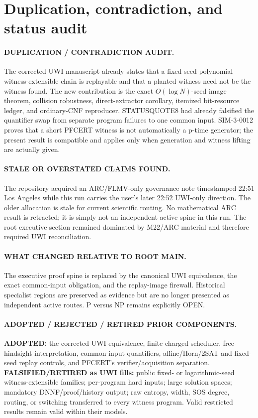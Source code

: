 \documentclass[11pt]{article}
\begin{document}
\section{Duplication, contradiction, and status audit}
\paragraph{DUPLICATION / CONTRADICTION AUDIT.}
The corrected UWI manuscript already states that a fixed-seed polynomial
witness-extensible chain is replayable and that a planted witness need not be the
witness found.  The new contribution is the exact $O(\log N)$-seed image theorem,
collision robustness, direct-extractor corollary, itemized bit-resource ledger, and
ordinary-CNF reproducer.  STATUSQUOTE8 had already falsified the quantifier swap
from separate program failures to one common input.  SIM-3-0012 proves that a short
PFCERT witness is not automatically a p-time generator; the present result is
compatible and applies only when generation and witness lifting are actually given.

\paragraph{STALE OR OVERSTATED CLAIMS FOUND.}
The repository acquired an ARC/FLMV-only governance note timestamped 22:51 Los
Angeles while this run carries the user's later 22:52 UWI-only direction.  The
older allocation is stale for current scientific routing.  No mathematical ARC
result is retracted; it is simply not an independent active spine in this run.
The root executive section remained dominated by M22/ARC material and therefore
required UWI reconciliation.

\paragraph{WHAT CHANGED RELATIVE TO ROOT MAIN.}
The executive proof spine is replaced by the canonical UWI equivalence, the exact
common-input obligation, and the replay-image firewall.  Historical specialist
regions are preserved as evidence but are no longer presented as independent active
routes.  P versus NP remains explicitly OPEN.

\paragraph{ADOPTED / REJECTED / RETIRED PRIOR COMPONENTS.}
\textbf{ADOPTED:} the corrected UWI equivalence, finite charged scheduler,
free-hindsight interpretation, common-input quantifiers, affine/Horn/2SAT and
fixed-seed replay controls, and PFCERT's verifier/acquisition separation.
\textbf{FALSIFIED/RETIRED as UWI fills:} public fixed- or logarithmic-seed
witness-extensible families; per-program hard inputs; large solution spaces;
mandatory DNNF/proof/history output; raw entropy, width, SOS degree, routing, or
switching transferred to every witness program.  Valid restricted results remain
valid within their models.
\end{document}
